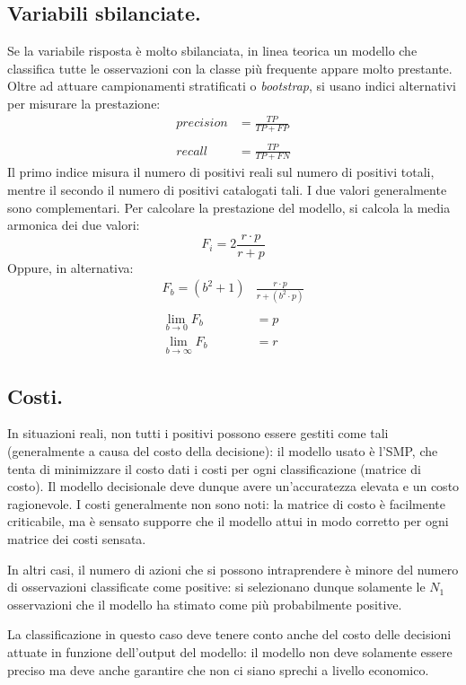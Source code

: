 \documentclass[11pt, a4page, twocolumn]{article}
\begin{document}
\subsection{Variabili sbilanciate.}
Se la variabile risposta è molto sbilanciata, in linea teorica un modello che classifica tutte le osservazioni con la classe più frequente appare molto prestante.
Oltre ad attuare campionamenti stratificati o \textit{bootstrap}, si usano indici alternativi per misurare la prestazione:
\begin{align*}
  precision &= \frac{TP}{TP + FP} \\ \\
  recall &= \frac{TP}{TP + FN}
\end{align*}
Il primo indice misura il numero di positivi reali sul numero di positivi totali, mentre il secondo il numero di positivi catalogati tali.
I due valori generalmente sono complementari.
Per calcolare la prestazione del modello, si calcola la media armonica dei due valori:
\begin{equation*}
  F_i = 2 \frac{r \cdot p}{r + p}
\end{equation*}
Oppure, in alternativa:
\begin{align*}
  F_b = (b^2 + 1) &\frac{r \cdot p}{r + (b^2 \cdot p)} \\ \\
  \lim_{b \to 0} F_b &= p \\
  \lim_{b \to \infty} F_b &= r
\end{align*}

\subsection{Costi.}
In situazioni reali, non tutti i positivi possono essere gestiti come tali (generalmente a causa del costo della decisione): il modello usato è l'SMP, che tenta di minimizzare il costo dati i costi per ogni classificazione (matrice di costo).
Il modello decisionale deve dunque avere un'accuratezza elevata e un costo ragionevole.
I costi generalmente non sono noti: la matrice di costo è facilmente criticabile, ma è sensato supporre che il modello attui in modo corretto per ogni matrice dei costi sensata.

In altri casi, il numero di azioni che si possono intraprendere è minore del numero di osservazioni classificate come positive: si selezionano dunque solamente le $N_1$ osservazioni che il modello ha stimato come più probabilmente positive.

La classificazione in questo caso deve tenere conto anche del costo delle decisioni attuate in funzione dell'output del modello: il modello non deve solamente essere preciso ma deve anche garantire che non ci siano sprechi a livello economico.
\end{document}
